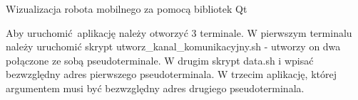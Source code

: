 Wizualizacja robota mobilnego za pomocą bibliotek Qt

Aby uruchomić~aplikację należy otworzyć 3 terminale. W pierwszym terminalu należy uruchomić skrypt utworz\+\_\+kanal\+\_\+komunikacyjny.\+sh -\/ utworzy on dwa połączone ze sobą pseudoterminale. W drugim skrypt data.\+sh i wpisać bezwzględny adres pierwszego pseudoterminala. W trzecim aplikację, której argumentem musi być bezwzględny adres drugiego pseudoterminala. 